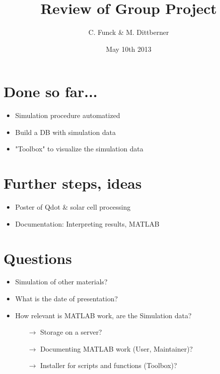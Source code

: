 \documentclass[a4paper, 11pt, landscape, twocolumn]{article}
\title{Review of Group Project}
\author{C. Funck \& M. Dittberner}
\date{May 10th 2013}
\begin{document}
	\maketitle
	
	\section{Done so far...}
		\begin{itemize}
			\itemsep 0pt
			\item Simulation procedure automatized
			\item Build a DB with simulation data
			\item "Toolbox" to visualize the simulation data
		\end{itemize}
	
	\section{Further steps, ideas}
		\begin{itemize}
			\itemsep 0pt
			
			\item Poster of Qdot \& solar cell processing
			\item Documentation: Interpreting results, MATLAB
		\end{itemize}		
	
	\section{Questions}
		\begin{itemize}
			\itemsep 0pt
			\item Simulation of other materials?
			\item What is the date of presentation?
			\item How relevant is MATLAB work, are the Simulation data?
						\begin{itemize}
							\itemsep 0pt
							\item[$\rightarrow$] Storage on a server?
							\item[$\rightarrow$] Documenting MATLAB work (User, Maintainer)?
							\item[$\rightarrow$] Installer for scripts and functions (Toolbox)?
						\end{itemize}
		\end{itemize}
\end{document}

